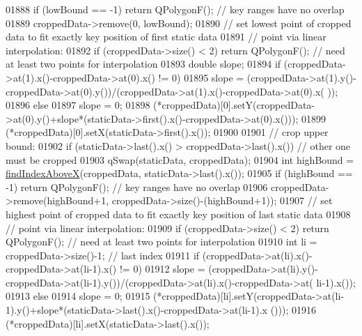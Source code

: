 \begin{DoxyCode}
01888     \textcolor{keywordflow}{if} (lowBound == -1) \textcolor{keywordflow}{return} QPolygonF(); \textcolor{comment}{// key ranges have no overlap}
01889     croppedData->remove(0, lowBound);
01890     \textcolor{comment}{// set lowest point of cropped data to fit exactly key position of first static data}
01891     \textcolor{comment}{// point via linear interpolation:}
01892     \textcolor{keywordflow}{if} (croppedData->size() < 2) \textcolor{keywordflow}{return} QPolygonF(); \textcolor{comment}{// need at least two points for interpolation}
01893     \textcolor{keywordtype}{double} slope;
01894     \textcolor{keywordflow}{if} (croppedData->at(1).x()-croppedData->at(0).x() != 0)
01895       slope = (croppedData->at(1).y()-croppedData->at(0).y())/(croppedData->at(1).x()-croppedData->at(0).x(
      ));
01896     \textcolor{keywordflow}{else}
01897       slope = 0;
01898     (*croppedData)[0].setY(croppedData->at(0).y()+slope*(staticData->first().x()-croppedData->at(0).x()));
01899     (*croppedData)[0].setX(staticData->first().x());
01900     
01901     \textcolor{comment}{// crop upper bound:}
01902     \textcolor{keywordflow}{if} (staticData->last().x() > croppedData->last().x()) \textcolor{comment}{// other one must be cropped}
01903       qSwap(staticData, croppedData);
01904     \textcolor{keywordtype}{int} highBound = \hyperlink{a00031_abab2a75b5e63630432bdd1f3b57f07fa}{findIndexAboveX}(croppedData, staticData->last().x());
01905     \textcolor{keywordflow}{if} (highBound == -1) \textcolor{keywordflow}{return} QPolygonF(); \textcolor{comment}{// key ranges have no overlap}
01906     croppedData->remove(highBound+1, croppedData->size()-(highBound+1));
01907     \textcolor{comment}{// set highest point of cropped data to fit exactly key position of last static data}
01908     \textcolor{comment}{// point via linear interpolation:}
01909     \textcolor{keywordflow}{if} (croppedData->size() < 2) \textcolor{keywordflow}{return} QPolygonF(); \textcolor{comment}{// need at least two points for interpolation}
01910     \textcolor{keywordtype}{int} li = croppedData->size()-1; \textcolor{comment}{// last index}
01911     \textcolor{keywordflow}{if} (croppedData->at(li).x()-croppedData->at(li-1).x() != 0)
01912       slope = (croppedData->at(li).y()-croppedData->at(li-1).y())/(croppedData->at(li).x()-croppedData->at(
      li-1).x());
01913     \textcolor{keywordflow}{else}
01914       slope = 0;
01915     (*croppedData)[li].setY(croppedData->at(li-1).y()+slope*(staticData->last().x()-croppedData->at(li-1).x
      ()));
01916     (*croppedData)[li].setX(staticData->last().x());

\end{DoxyCode}
